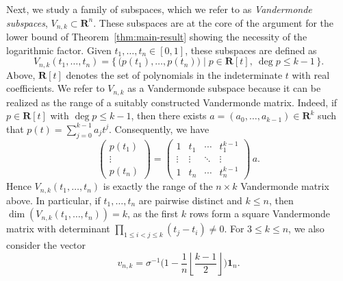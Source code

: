 \documentclass[11pt, letterpaper, hidelinks]{article}
\newcommand{\R}{\mathbf R}
\newcommand{\floor}[1]{\left\lfloor #1 \right\rfloor}
\newcommand{\1}{\mathbf 1}
\renewcommand{\leq}{\leqslant}
\theoremstyle{plain}
\theoremstyle{definition}
\begin{document}
Next, we study a family of subspaces, which we refer to as \emph{Vandermonde subspaces}, $V_{n,k} \subset \R^n$. These subspaces are at the core of the argument for the lower bound of Theorem~\ref{thm:main-result} showing the necessity of the logarithmic factor.
Given $t_1,\dots,t_n\in[0,1]$, these subspaces are defined as
\[
V_{n, k}(t_1, \dots, t_n) = \Big\{\,\big(p(t_1), \dots, p(t_n)\big) \mid p \in \R[t],~ \deg p \leq k - 1 \,\Big\}.
\]
Above, $\R[t]$ denotes the set of polynomials in the indeterminate $t$ with real coefficients. We refer to $V_{n,k}$ as a Vandermonde subspace because 
it can be realized as the range of a suitably constructed Vandermonde matrix. Indeed, if
$p \in \R[t]$ with $\deg p \leq k - 1$, then there exists 
$a = (a_0, \dots, a_{k-1}) \in \R^k$ such that 
$
p(t) = \sum_{j=0}^{k-1} a_j t^j$. 
Consequently, we have 
\[
\begin{pmatrix}
p(t_1) \\ 
\vdots \\	
p(t_n)
\end{pmatrix}
=
\begin{pmatrix}
1 & t_1 & \cdots & t_1^{k-1} \\
\vdots & \vdots & \ddots & \vdots \\
1 & t_n & \cdots & t_n^{k-1}
\end{pmatrix} \, 
a.
\]
Hence $V_{n,k}(t_1, \dots, t_n)$ is exactly the range of the $n \times k$ Vandermonde matrix above. In particular, if
$t_1, \dots, t_n$ are pairwise distinct and $k \leq n$, then $\dim(V_{n,k}(t_1, \dots, t_n)) = k$, as the first $k$ rows form a square
Vandermonde matrix with determinant $\prod_{1 \leq i < j \leq k} (t_j - t_i) \neq 0$. 
For $3 \leq k \leq n$, we also consider the vector 
\[
v_{n, k} = \sigma^{-1}\bigg(1-\frac{1}{n} \floor{\frac{k-1}{2}}\bigg) \1_n.
\]
\end{document}
